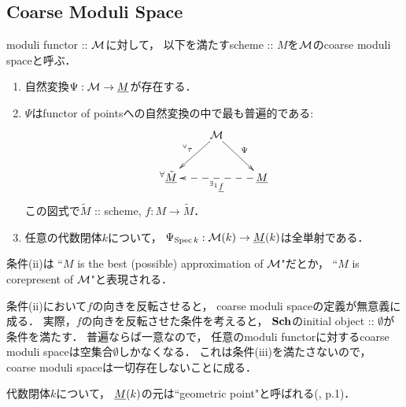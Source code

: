 \documentclass[a4paper]{jsarticle}
\begin{document}
    \subsection{Coarse Moduli Space}
    \begin{Def}\label{def:coarse-moduli}
        moduli functor :: $\mathcal{M}$に対して，
        以下を満たすscheme :: $M$を$\mathcal{M}$のcoarse moduli spaceと呼ぶ．
        \begin{enumerate}[label=(\roman*), leftmargin=*]
            \item
                自然変換$\Psi: \mathcal{M} \to \underline{M}$が存在する．
            \item
                $\Psi$はfunctor of pointsへの自然変換の中で最も普遍的である:
                \[
                \xymatrix
                {
                    {} & \ar[ld]_-{{}^{\forall} \tau}\ftorM \ar[rd]^-{\Psi}& {} \\
                    {}^{\forall}\ftor{\tilde{M}} & {} & \ar@{-->}[ll]^-{{}^{\exists_1} \ftor{f}} \ftor{M}
                }
                \]
                この図式で$\tilde{M}$ :: scheme, $f: M \to \tilde{M}$．
            \item
                任意の代数閉体$k$について，
                $\Psi_{\operatorname{Spec} k}: \mathcal{M}(k) \to \underline{M}(k)$は全単射である．
        \end{enumerate}
    \end{Def}
    条件(ii)は
    ``$M$ is the best (possible) approximation of $\mathcal{M}$"だとか，
    ``$M$ is corepresent of $\mathcal{M}$"と表現される．

    \begin{Remark}
        条件(ii)において$f$の向きを反転させると，
        coarse moduli spaceの定義が無意義に成る．
        実際，$f$の向きを反転させた条件を考えると，
        $\mathbf{Sch}$のinitial object :: $\emptyset$が条件を満たす．
        普遍ならば一意なので，
        任意のmoduli functorに対するcoarse moduli spaceは空集合$\emptyset$しかなくなる．
        これは条件(iii)を満たさないので，
        coarse moduli spaceは一切存在しないことに成る．
    \end{Remark}

    \begin{Remark}
        代数閉体$k$について，
        $\underline{M}(k)$の元は``geometric point"と呼ばれる(\cite{GIT}, p.1)．
    \end{Remark}
\end{document}
